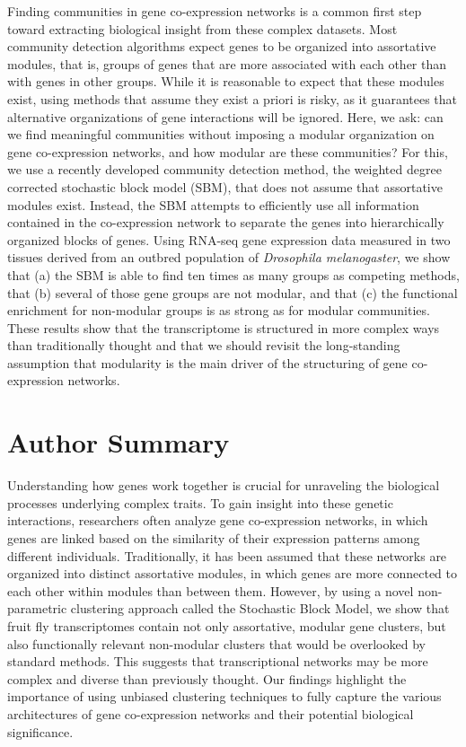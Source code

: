 \documentclass[
]{article}
\begin{document}
Finding communities in gene co-expression networks is a common first
step toward extracting biological insight from these complex datasets.
Most community detection algorithms expect genes to be organized into
assortative modules, that is, groups of genes that are more associated
with each other than with genes in other groups. While it is reasonable
to expect that these modules exist, using methods that assume they exist
a priori is risky, as it guarantees that alternative organizations of
gene interactions will be ignored. Here, we ask: can we find meaningful
communities without imposing a modular organization on gene
co-expression networks, and how modular are these communities? For this,
we use a recently developed community detection method, the weighted
degree corrected stochastic block model (SBM), that does not assume that
assortative modules exist. Instead, the SBM attempts to efficiently use
all information contained in the co-expression network to separate the
genes into hierarchically organized blocks of genes. Using RNA-seq gene
expression data measured in two tissues derived from an outbred
population of \textit{Drosophila melanogaster}, we show that (a) the SBM
is able to find ten times as many groups as competing methods, that (b)
several of those gene groups are not modular, and that (c) the
functional enrichment for non-modular groups is as strong as for modular
communities. These results show that the transcriptome is structured in
more complex ways than traditionally thought and that we should revisit
the long-standing assumption that modularity is the main driver of the
structuring of gene co-expression networks.

\section{Author Summary}\label{author-summary}

Understanding how genes work together is crucial for unraveling the
biological processes underlying complex traits. To gain insight into
these genetic interactions, researchers often analyze gene co-expression
networks, in which genes are linked based on the similarity of their
expression patterns among different individuals. Traditionally, it has
been assumed that these networks are organized into distinct assortative
modules, in which genes are more connected to each other within modules
than between them. However, by using a novel non-parametric clustering
approach called the Stochastic Block Model, we show that fruit fly
transcriptomes contain not only assortative, modular gene clusters, but
also functionally relevant non-modular clusters that would be overlooked
by standard methods. This suggests that transcriptional networks may be
more complex and diverse than previously thought. Our findings highlight
the importance of using unbiased clustering techniques to fully capture
the various architectures of gene co-expression networks and their
potential biological significance.
\end{document}
